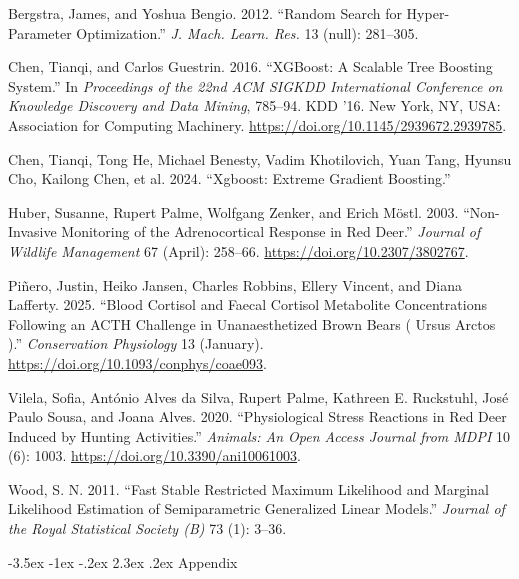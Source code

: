 \documentclass[
  letterpaper,
  DIV=11,
  numbers=noendperiod,
  twocolumn,
  open=any]{scrreprt}
\makeatletter
\newlength{\cslhangindent}
\newenvironment{CSLReferences}[2] %
 {\begin{list}{}{%
  \setlength{\itemindent}{0pt}
  \setlength{\leftmargin}{0pt}
  \setlength{\parsep}{0pt}
  \ifodd #1
   \setlength{\leftmargin}{\cslhangindent}
   \setlength{\itemindent}{-1\cslhangindent}
  \fi
  \setlength{\itemsep}{#2\baselineskip}}}
 {\end{list}}
\renewcommand\chapter{\@startsection{chapter}{0}{\z@}%
  {-3.5ex \@plus -1ex \@minus -.2ex}%
  {2.3ex \@plus.2ex}%
  {\normalfont\Large\bfseries}}
\makeatother
\begin{document}
\label{refs}
\begin{CSLReferences}{1}{0}
Bergstra, James, and Yoshua Bengio. 2012. {``Random Search for
Hyper-Parameter Optimization.''} \emph{J. Mach. Learn. Res.} 13 (null):
281--305.

Chen, Tianqi, and Carlos Guestrin. 2016. {``XGBoost: A Scalable Tree
Boosting System.''} In \emph{Proceedings of the 22nd ACM SIGKDD
International Conference on Knowledge Discovery and Data Mining},
785--94. KDD '16. New York, NY, USA: Association for Computing
Machinery. \url{https://doi.org/10.1145/2939672.2939785}.

Chen, Tianqi, Tong He, Michael Benesty, Vadim Khotilovich, Yuan Tang,
Hyunsu Cho, Kailong Chen, et al. 2024. {``Xgboost: {Extreme Gradient
Boosting}.''}

Huber, Susanne, Rupert Palme, Wolfgang Zenker, and Erich Möstl. 2003.
{``Non-Invasive Monitoring of the Adrenocortical Response in Red
Deer.''} \emph{Journal of Wildlife Management} 67 (April): 258--66.
\url{https://doi.org/10.2307/3802767}.

Piñero, Justin, Heiko Jansen, Charles Robbins, Ellery Vincent, and Diana
Lafferty. 2025. {``Blood Cortisol and Faecal Cortisol Metabolite
Concentrations Following an ACTH Challenge in Unanaesthetized Brown
Bears ( Ursus Arctos ).''} \emph{Conservation Physiology} 13 (January).
\url{https://doi.org/10.1093/conphys/coae093}.

Vilela, Sofia, António Alves da Silva, Rupert Palme, Kathreen E.
Ruckstuhl, José Paulo Sousa, and Joana Alves. 2020. {``Physiological
{Stress Reactions} in {Red Deer Induced} by {Hunting Activities}.''}
\emph{Animals: An Open Access Journal from MDPI} 10 (6): 1003.
\url{https://doi.org/10.3390/ani10061003}.

Wood, S. N. 2011. {``Fast Stable Restricted Maximum Likelihood and
Marginal Likelihood Estimation of Semiparametric Generalized Linear
Models.''} \emph{Journal of the Royal Statistical Society (B)} 73 (1):
3--36.

\end{CSLReferences}

\onecolumn

\chapter{Appendix}\label{appendix}
\end{document}
